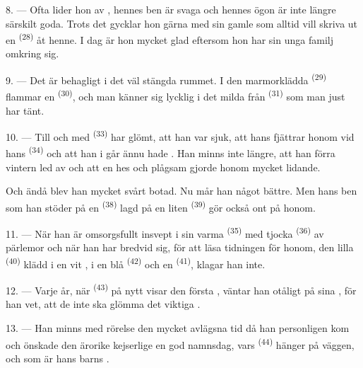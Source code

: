 8. --- Ofta lider hon av , hennes ben är
svaga och hennes ögon är inte längre särskilt goda. Trots det gycklar hon gärna med sin gamle
 som alltid vill skriva ut en
 \textsuperscript{(28)} åt henne. I dag är hon mycket glad
eftersom hon har sin unga familj omkring sig.

9. --- Det är behagligt i det väl stängda rummet. I den marmorklädda
 \textsuperscript{(29)} flammar en 
\textsuperscript{(30)}, och man känner sig lycklig i det milda  från
 \textsuperscript{(31)} som man just har tänt.

\VUsaut{4.2mm}
\VUsaut{3.0mm}

10. --- Till och med  \textsuperscript{(33)} har glömt, att han var sjuk,
att hans  fjättrar honom vid hans
 \textsuperscript{(34)} och att han i går ännu hade . Han minns inte längre, att han förra vintern led av
 och att en hes och plågsam  gjorde honom
mycket lidande.

Och ändå blev han mycket svårt botad. Nu mår han något bättre. Men hans ben som han stöder på
en  \textsuperscript{(38)} lagd på en liten
 \textsuperscript{(39)} gör också ont på honom.

11. --- När han är omsorgsfullt insvept i sin varma  \textsuperscript{(35)}
med tjocka  \textsuperscript{(36)} av pärlemor och när han har bredvid sig,
för att läsa tidningen för honom, den lilla 
\textsuperscript{(40)} klädd i en vit
, i en blå  \textsuperscript{(42)} och en
 \textsuperscript{(41)}, klagar han inte.

12. --- Varje år, när  \textsuperscript{(43)} på nytt visar
 den första , väntar han otåligt på sina
, för han vet, att de inte ska glömma det viktiga
.

13. --- Han minns med rörelse den mycket avlägsna tid då han personligen kom och önskade den
ärorike kejserlige  en god namnsdag, vars
 \textsuperscript{(44)} hänger på väggen, och som är hans barns
.
\VUsaut{6.0mm}
\VUfilet{22mm}
